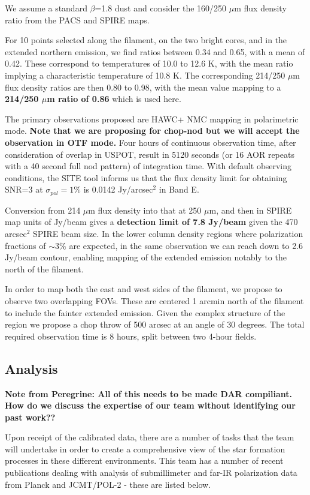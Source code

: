 \documentclass[11pt]{amsart}
\begin{document}
We assume a standard $\beta$=1.8 dust and consider the 160/250 $\mu$m flux density ratio from the PACS and SPIRE maps. 

For 10 points selected along the filament, on the two bright cores, and in the extended northern emission, we find ratios between 0.34 and 0.65, with a mean of 0.42. These correspond to temperatures of 10.0 to 12.6 K, with the mean ratio implying a characteristic temperature of 10.8 K.  
The corresponding 214/250 $\mu$m flux density ratios are then 0.80 to 0.98, with the mean value mapping to a {\bf 214/250 $\mu$m ratio of 0.86} which is used here.
 
The primary observations proposed are HAWC+ NMC mapping in polarimetric mode. 
{\bf Note that we are proposing for chop-nod but we will accept the observation in OTF mode.}
Four hours of continuous observation time, after consideration of overlap in USPOT, result in 5120 seconds (or 16 AOR repeats with a 40 second full nod pattern) of
integration time. With default observing conditions, the SITE tool informs us that the flux density limit for obtaining SNR=3 at $\sigma_{pol}  = 1\%$
is 0.0142 Jy/arcsec$^2$ in Band E. 

Conversion from 214 $\mu$m flux density into that at 250 $\mu$m, and then in SPIRE map units of Jy/beam gives a {\bf detection limit of 7.8 Jy/beam}
given the 470 arcsec$^2$ SPIRE beam size.  In the lower column density regions where polarization fractions of $\sim3\%$ are expected, in the same
observation we can reach down to 2.6 Jy/beam contour, enabling mapping of the extended emission notably to the north of the filament.

In order to map both the east and west sides of the filament, we propose to observe two overlapping FOVs. These are centered 
1 arcmin north of the filament to include
the fainter extended emission. Given the complex structure of the region we propose a chop throw of 500 arcsec at an angle of 30 degrees. 
The total required observation time is 8 hours, split between two 4-hour fields.


\subsection{Analysis}
{\bf Note from Peregrine: All of this needs to be made DAR compiliant.  How do we discuss the expertise of our team without identifying our past work??}

Upon receipt of the calibrated data, there are a number of tasks that the team will undertake in order
to create a comprehensive view of the star formation processes in these different environments. This team has a number of recent publications dealing with analysis of submillimeter and far-IR polarization data from Planck and JCMT/POL-2 - these are listed below.
\end{document}
